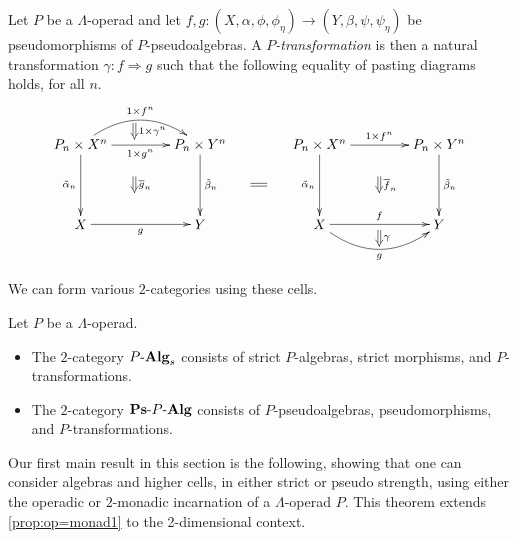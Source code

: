 \begin{Defi}\label{Defi:Ptrans}
Let $P$ be a $\Lambda$-operad and let $f, g \colon (X, \alpha, \phi, \phi_\eta) \rightarrow (Y, \beta, \psi, \psi_\eta)$ be pseudomorphisms of $P$-pseudoalgebras. A \textit{$P$-transformation} is then a natural transformation $\gamma \colon f \Rightarrow g$ such that the following equality of pasting diagrams holds, for all $n$.
    \[
        \xy
            (0,0)*+{P_n \times X^n}="00";
            (30,0)*+{P_n \times Y^n}="10";
            (0,-20)*+{X}="01";
            (30,-20)*+{Y}="11";
            {\ar@/^1.5pc/^{1 \times f^n} "00" ; "10"};
            {\ar_{1 \times g^n} "00" ; "10"};
            {\ar^{\tilde{\beta}_n} "10" ; "11"};
            {\ar_{\tilde{\alpha}_n} "00" ; "01"};
            {\ar_{g} "01" ; "11"};
            {\ar@{=>}^{1 \times \gamma^n} (13.5,5.5) ; (13.5,1.5)};
            {\ar@{=>}^{\overline{g}_n} (13.5,-8) ; (13.5,-12)};
            (60,0)*+{P_n \times X^n}="x00";
            (90,0)*+{P_n \times Y^n}="x10";
            (60,-20)*+{X}="x01";
            (90,-20)*+{Y}="x11";
            {\ar^{1 \times f^n} "x00" ; "x10"};
            {\ar^{\tilde{\beta}_n} "x10" ; "x11"};
            {\ar_{\tilde{\alpha}_n} "x00" ; "x01"};
            {\ar^{f} "x01" ; "x11"};
            {\ar@/_1.5pc/_{g} "x01" ; "x11"};
            {\ar@{=>}^{\gamma} (75,-21.5) ; (75,-25.5)};
            {\ar@{=>}^{\overline{f}_n} (75,-8) ; (75,-12)};
            {\ar@{=} (42.75,-10) ; (46.75,-10)};
        \endxy
    \]
\end{Defi}

We can form various $2$-categories using these cells.

\begin{Defi}\label{Defi:2cat-of-algs-lop}
Let $P$ be a $\Lambda$-operad.
\begin{itemize}
\item The $2$-category $P\mbox{-}\mathbf{Alg}_{s}$ consists of strict $P$-algebras, strict morphisms, and $P$-transformations.
\item The $2$-category $\mathbf{Ps}\mbox{-}P\mbox{-}\mathbf{Alg}$ consists of $P$-pseudoalgebras, pseudomorphisms, and $P$-transformations.
\end{itemize}
\end{Defi}

Our first main result in this section is the following, showing that one can consider algebras and higher cells, in either strict or pseudo strength, using either the operadic or $2$-monadic incarnation of a $\Lambda$-operad $P$. This theorem extends \cref{prop:op=monad1} to the 2-dimensional context.

